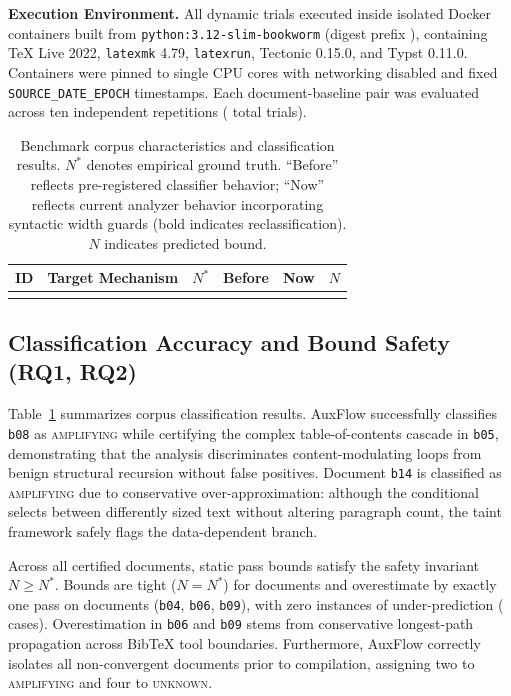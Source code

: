 \documentclass[conference]{IEEEtran}
\newcommand{\cls}[1]{\textsc{#1}}
\begin{document}
\textbf{Execution Environment.}
All dynamic trials executed inside isolated Docker containers built from \texttt{python:3.12-slim-bookworm} (digest prefix \texttt{\ImageDigest}), containing TeX Live 2022, \texttt{latexmk} 4.79, \texttt{latexrun}, Tectonic 0.15.0, and Typst 0.11.0. Containers were pinned to single CPU cores with networking disabled and fixed \texttt{SOURCE\_DATE\_EPOCH} timestamps. Each document-baseline pair was evaluated across ten independent repetitions (\NRecords{} total trials).

\begin{table}[t]
\caption{Benchmark corpus characteristics and classification results. $N^{*}$ denotes empirical ground truth. ``Before'' reflects pre-registered classifier behavior; ``Now'' reflects current analyzer behavior incorporating syntactic width guards (bold indicates reclassification). $N$ indicates predicted bound.}
\label{tab:corpus}
\centering
\footnotesize
\begin{tabular}{@{}llrllr@{}}
\toprule
ID & Target Mechanism & $N^{*}$ & Before & Now & $N$ \\
\midrule
\\
\bottomrule
\end{tabular}
\end{table}

\subsection{Classification Accuracy and Bound Safety (RQ1, RQ2)}

Table~\ref{tab:corpus} summarizes corpus classification results. AuxFlow successfully classifies \texttt{b08} as \cls{amplifying} while certifying the complex table-of-contents cascade in \texttt{b05}, demonstrating that the analysis discriminates content-modulating loops from benign structural recursion without false positives. Document \texttt{b14} is classified as \cls{amplifying} due to conservative over-approximation: although the conditional selects between differently sized text without altering paragraph count, the taint framework safely flags the data-dependent branch.

Across all \NCertified{} certified documents, static pass bounds satisfy the safety invariant $N \ge N^*$. Bounds are tight ($N = N^*$) for \BoundTight{} documents and overestimate by exactly one pass on \BoundOverOne{} documents (\texttt{b04}, \texttt{b06}, \texttt{b09}), with zero instances of under-prediction (\BoundUnder{} cases). Overestimation in \texttt{b06} and \texttt{b09} stems from conservative longest-path propagation across BibTeX tool boundaries. Furthermore, AuxFlow correctly isolates all \NNonconv{} non-convergent documents prior to compilation, assigning two to \cls{amplifying} and four to \cls{unknown}.
\end{document}
